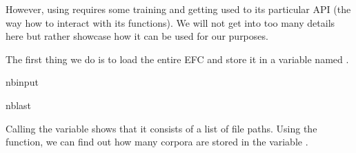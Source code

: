 \documentclass[letterpaper,10pt,english]{sphinxmanual}
\begin{document}
\sphinxAtStartPar
However, using  requires some training and getting used to its particular API (the way how to interact with its functions). We will not get into too many details here but rather showcase how it can be used for our purposes.

\sphinxAtStartPar
The first thing we do is to load the entire EFC and store it in a variable named .

\begin{sphinxuseclass}{nbinput}
\begin{sphinxuseclass}{nblast}
{
\begin{sphinxVerbatim}[commandchars=\\\{\}]
\llap{\color{nbsphinxin}[3]:\,\hspace{\fboxrule}\hspace{\fboxsep}}
  
\end{sphinxVerbatim}
}

\end{sphinxuseclass}
\end{sphinxuseclass}
\sphinxAtStartPar
Calling the variable  shows that it consists of a list of file paths. Using the  function, we can find out how many corpora are stored in the variable .
\end{document}
